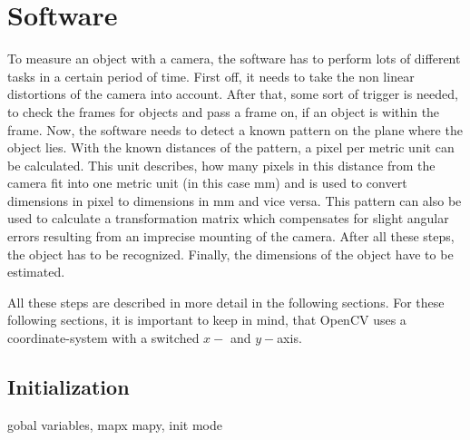 \newpage
\section{Software}
To measure an object with a camera, the software has to perform lots of different tasks in a certain period of time.
First off, it needs to take the non linear distortions of the camera into account.
After that, some sort of trigger is needed, to check the frames for objects and pass a frame on, if an object is within the frame.
Now, the software needs to detect a known pattern on the plane where the object lies.
With the known distances of the pattern, a pixel per metric unit can be calculated.
This unit describes, how many pixels in this distance from the camera fit into one metric unit (in this case mm) and is used to convert dimensions in pixel to dimensions in mm and vice versa.
This pattern can also be used to calculate a transformation matrix which compensates for slight angular errors resulting from an imprecise mounting of the camera.
After all these steps, the object has to be recognized.
Finally, the dimensions of the object have to be estimated.

All these steps are described in more detail in the following sections.
For these following sections, it is important to keep in mind, that OpenCV uses a coordinate-system with a switched $x-$ and $y-$axis. 


\lstset{style=mystyle}

\subsection{Initialization}
gobal variables, mapx mapy, init mode

